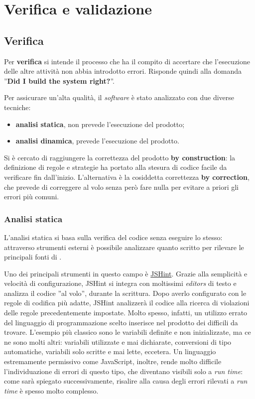 \chapter{Verifica e validazione} \label{vev}

\section{Verifica}
Per \textbf{verifica} si intende il processo che ha il compito di accertare che l'esecuzione delle altre attività non abbia introdotto errori. Risponde quindi alla domanda ''\textbf{Did I build the system right?}''.

Per assicurare un'alta qualità, il \textit{software} è stato analizzato con due diverse tecniche:
\begin{itemize}
\item \textbf{analisi statica}, non prevede l'esecuzione del prodotto;
\item \textbf{analisi dinamica}, prevede l'esecuzione del prodotto.
\end{itemize}

Si è cercato di raggiungere la correttezza del prodotto \textbf{by construction}: la definizione di regole e strategie ha portato alla stesura di codice facile da verificare fin dall'inizio. L'alternativa è la cosiddetta correttezza \textbf{by correction}, che prevede di correggere al volo senza però fare nulla per evitare a priori gli errori più comuni.

\subsection{Analisi statica}
L'analisi statica si basa sulla verifica del codice senza eseguire lo stesso: attraverso strumenti esterni è possibile analizzare quanto scritto per rilevare le principali fonti di . 

Uno dei principali strumenti in questo campo è \hyperref[jshint]{JSHint}. Grazie alla semplicità e velocità di configurazione, JSHint si integra con moltissimi \textit{editors} di testo e analizza il codice ''al volo'', durante la scrittura. Dopo averlo configurato con le regole di codifica più adatte, JSHint analizzerà il codice alla ricerca di violazioni delle regole precedentemente impostate. Molto spesso, infatti, un utilizzo errato del linguaggio di programmazione scelto inserisce nel prodotto dei  difficili da trovare. L'esempio più classico sono le variabili definite e non inizializzate, ma ce ne sono molti altri: variabili utilizzate e mai dichiarate, conversioni di tipo automatiche, variabili solo scritte e mai lette, eccetera. Un linguaggio estremamente permissivo come JavaScript, inoltre, rende molto difficile l'individuazione di errori di questo tipo, che diventano visibili solo a \textit{run time}: come sarà spiegato successivamente, risalire alla causa degli errori rilevati a \textit{run time} è spesso molto complesso.

